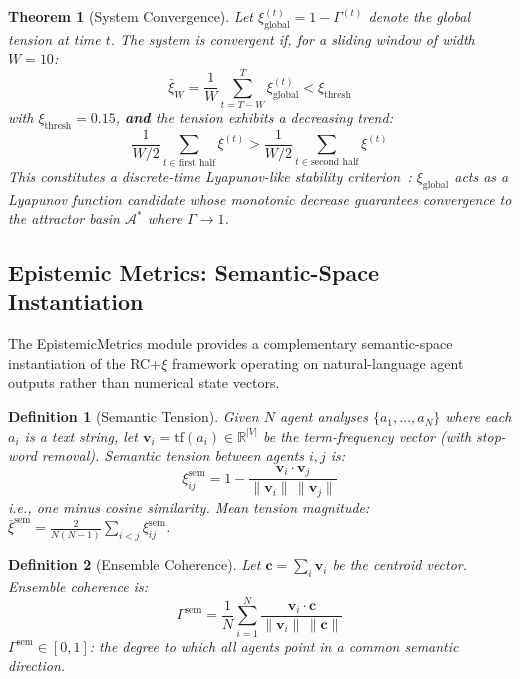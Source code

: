 \documentclass[11pt,a4paper]{article}
\newtheorem{definition}{Definition}[section]
\newtheorem{theorem}{Theorem}[section]
\begin{document}
\begin{theorem}[System Convergence]
\label{thm:convergence}
Let $\xi^{(t)}_{\text{global}} = 1 - \Gamma^{(t)}$ denote the global tension at time $t$. The system is convergent if, for a sliding window of width $W = 10$:
\begin{equation}
  \bar{\xi}_W = \frac{1}{W}\sum_{t=T-W}^{T} \xi^{(t)}_{\text{global}} < \xi_{\text{thresh}}
  \label{eq:convergence_criterion}
\end{equation}
with $\xi_{\text{thresh}} = 0.15$, \textbf{and} the tension exhibits a decreasing trend:
\begin{equation}
  \frac{1}{W/2}\sum_{t \in \text{first half}} \xi^{(t)} > \frac{1}{W/2}\sum_{t \in \text{second half}} \xi^{(t)}
  \label{eq:decreasing_trend}
\end{equation}
This constitutes a discrete-time Lyapunov-like stability criterion~\citep{khalil2002nonlinear}: $\xi_{\text{global}}$ acts as a Lyapunov function candidate whose monotonic decrease guarantees convergence to the attractor basin $\mathcal{A}^*$ where $\Gamma \to 1$.
\end{theorem}

\subsection{Epistemic Metrics: Semantic-Space Instantiation}

The EpistemicMetrics module provides a complementary semantic-space instantiation of the RC+$\xi$ framework operating on natural-language agent outputs rather than numerical state vectors.

\begin{definition}[Semantic Tension]
Given $N$ agent analyses $\{a_1, \ldots, a_N\}$ where each $a_i$ is a text string, let $\mathbf{v}_i = \text{tf}(a_i) \in \mathbb{R}^{|V|}$ be the term-frequency vector (with stop-word removal). Semantic tension between agents $i, j$ is:
\begin{equation}
  \xi_{ij}^{\text{sem}} = 1 - \frac{\mathbf{v}_i \cdot \mathbf{v}_j}{\|\mathbf{v}_i\| \, \|\mathbf{v}_j\|}
  \label{eq:semantic_tension}
\end{equation}
i.e., one minus cosine similarity. Mean tension magnitude: $\bar{\xi}^{\text{sem}} = \frac{2}{N(N-1)}\sum_{i<j} \xi_{ij}^{\text{sem}}$.
\end{definition}

\begin{definition}[Ensemble Coherence]
Let $\mathbf{c} = \sum_i \mathbf{v}_i$ be the centroid vector. Ensemble coherence is:
\begin{equation}
  \Gamma^{\text{sem}} = \frac{1}{N} \sum_{i=1}^{N} \frac{\mathbf{v}_i \cdot \mathbf{c}}{\|\mathbf{v}_i\| \, \|\mathbf{c}\|}
  \label{eq:semantic_coherence}
\end{equation}
$\Gamma^{\text{sem}} \in [0, 1]$: the degree to which all agents point in a common semantic direction.
\end{definition}
\end{document}
